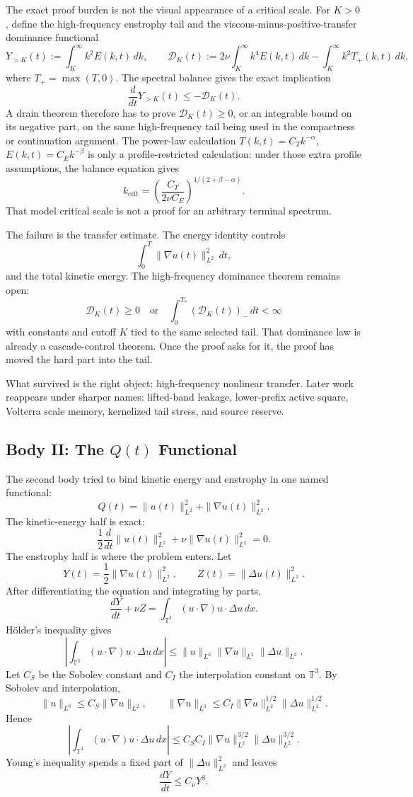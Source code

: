 The exact proof burden is not the visual appearance of a critical scale.  For
\(K>0\), define the high-frequency enstrophy tail and the
viscous-minus-positive-transfer dominance functional
\[
  Y_{>K}(t):=\int_K^\infty k^2E(k,t)\,dk,
  \qquad
  \mathcal D_K(t):=
  2\nu\int_K^\infty k^4E(k,t)\,dk
  -
  \int_K^\infty k^2T_+(k,t)\,dk,
\]
where \(T_+=\max(T,0)\).  The spectral balance gives the exact implication
\[
  \frac{d}{dt}Y_{>K}(t)
  \le
  -\mathcal D_K(t).
\]
A drain theorem therefore has to prove \(\mathcal D_K(t)\ge0\), or an
integrable bound on its negative part, on the same high-frequency tail being
used in the compactness or continuation argument.  The power-law calculation
\(T(k,t)=C_Tk^{-\alpha}\), \(E(k,t)=C_Ek^{-\beta}\) is only a profile-restricted
calculation: under those extra profile assumptions, the balance equation gives
\[
  k_{\mathrm{crit}}
  =
  \left(\frac{C_T}{2\nu C_E}\right)^{1/(2+\beta-\alpha)}.
\]
That model critical scale is not a proof for an arbitrary terminal spectrum.

The failure is the transfer estimate.
The energy identity controls
\[
  \int_0^T\|\nabla u(t)\|_{L^2}^2\,dt,
\]
and the total kinetic energy.
The high-frequency dominance theorem remains open:
\[
  \mathcal D_K(t)\ge0
  \quad\text{or}\quad
  \int_0^{T_*}(\mathcal D_K(t))_-\,dt<\infty
\]
with constants and cutoff \(K\) tied to the same selected tail.
That dominance law is already a cascade-control theorem.
Once the proof asks for it, the proof has moved the hard part into the tail.

What survived is the right object: high-frequency nonlinear transfer.
Later work reappears under sharper names:
lifted-band leakage, lower-prefix active square, Volterra scale memory,
kernelized tail stress, and source reserve.

\subsection{Body II: The \(Q(t)\) Functional}

The second body tried to bind kinetic energy and enstrophy in one named
functional:
\[
  Q(t)
  =
  \|u(t)\|_{L^2}^2+\|\nabla u(t)\|_{L^2}^2 .
\]
The kinetic-energy half is exact:
\[
  \frac12\frac{d}{dt}\|u(t)\|_{L^2}^2
  +\nu\|\nabla u(t)\|_{L^2}^2
  =0 .
\]
The enstrophy half is where the problem enters.
Let
\[
  Y(t)=\frac12\|\nabla u(t)\|_{L^2}^2,
  \qquad
  Z(t)=\|\Delta u(t)\|_{L^2}^2 .
\]
After differentiating the equation and integrating by parts,
\[
  \frac{dY}{dt}+\nu Z
  =
  \int_{\mathbb T^3}(u\cdot\nabla)u\cdot\Delta u\,dx .
\]
H\"older's inequality gives
\[
  \left|
    \int_{\mathbb T^3}(u\cdot\nabla)u\cdot\Delta u\,dx
  \right|
  \le
  \|u\|_{L^6}\|\nabla u\|_{L^3}\|\Delta u\|_{L^2}.
\]
Let \(C_S\) be the Sobolev constant and \(C_I\) the interpolation constant on
\(\mathbb T^3\).  By Sobolev and interpolation,
\[
  \|u\|_{L^6}\le C_S\|\nabla u\|_{L^2},
  \qquad
  \|\nabla u\|_{L^3}
  \le C_I
  \|\nabla u\|_{L^2}^{1/2}\|\Delta u\|_{L^2}^{1/2}.
\]
Hence
\[
  \left|
    \int_{\mathbb T^3}(u\cdot\nabla)u\cdot\Delta u\,dx
  \right|
  \le C_SC_I
  \|\nabla u\|_{L^2}^{3/2}\|\Delta u\|_{L^2}^{3/2}.
\]
Young's inequality spends a fixed part of \(\|\Delta u\|_{L^2}^2\) and leaves
\[
  \frac{dY}{dt}
  \le
  C_\nu Y^3 .
\]

